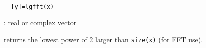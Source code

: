 
\begin{mandesc}
   \\ %
\end{mandesc}
\begin{calling_sequence}
\begin{verbatim}
  [y]=lgfft(x)  
\end{verbatim}
\end{calling_sequence}
\begin{parameters}
  \begin{varlist}
    : real or complex vector
  \end{varlist}
\end{parameters}
\begin{mandescription}
  returns the lowest power of 2 larger than \verb!size(x)! (for FFT use).
\end{mandescription}
